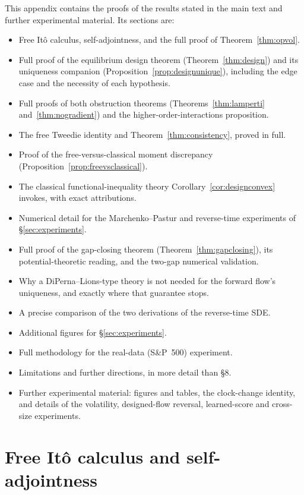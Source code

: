 \documentclass[11pt]{article}
\theoremstyle{plain}
\theoremstyle{definition}
\theoremstyle{remark}
\begin{document}
\noindent This appendix contains the proofs of the results stated in the main text and further
experimental material. Its sections are:
\begin{itemize}[leftmargin=1.4em,itemsep=0pt,topsep=2pt]
\item[A] Free It\^o calculus, self-adjointness, and the full proof of
  Theorem~\ref{thm:opvol}.
\item[B] Full proof of the equilibrium design theorem (Theorem~\ref{thm:design}) and
  its uniqueness companion (Proposition~\ref{prop:designunique}), including the edge
  case and the necessity of each hypothesis.
\item[C] Full proofs of both obstruction theorems (Theorems~\ref{thm:lamperti}
  and~\ref{thm:nogradient}) and the higher-order-interactions proposition.
\item[D] The free Tweedie identity and Theorem~\ref{thm:consistency}, proved in full.
\item[E] Proof of the free-versus-classical moment discrepancy
  (Proposition~\ref{prop:freevsclassical}).
\item[F] The classical functional-inequality theory Corollary~\ref{cor:designconvex}
  invokes, with exact attributions.
\item[G] Numerical detail for the Marchenko--Pastur and reverse-time experiments of
  \S\ref{sec:experiments}.
\item[H] Full proof of the gap-closing theorem (Theorem~\ref{thm:gapclosing}),
  its potential-theoretic reading, and the two-gap numerical validation.
\item[I] Why a DiPerna--Lions-type theory is not needed for the forward flow's
  uniqueness, and exactly where that guarantee stops.
\item[J] A precise comparison of the two derivations of the reverse-time SDE.
\item[K] Additional figures for \S\ref{sec:experiments}.
\item[L] Full methodology for the real-data (S\&P~500) experiment.
\item[M] Limitations and further directions, in more detail than \S8.
\item[N] Further experimental material: figures and tables, the clock-change identity, and details of the
  volatility, designed-flow reversal, learned-score and cross-size experiments.
\end{itemize}
\bigskip

\section{Free It\^o calculus and self-adjointness}\label{app:selfadjoint}
\end{document}

